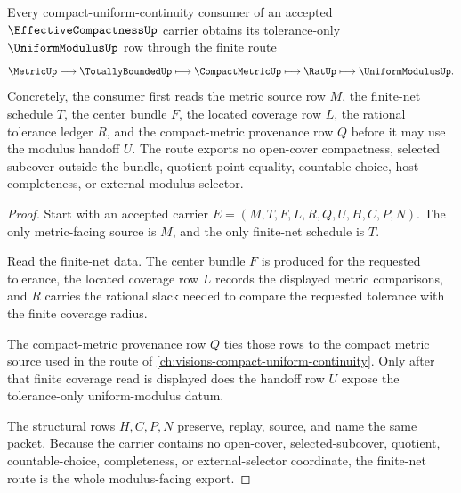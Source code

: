 \begin{theorem}
\label{thm:effective-compactness-finite-net-modulus}
Every compact-uniform-continuity consumer of an accepted $\EffectiveCompactnessUp$ carrier obtains its tolerance-only $\UniformModulusUp$ row through the finite route
$$
\MetricUp \longmapsto \TotallyBoundedUp \longmapsto \CompactMetricUp \longmapsto \RatUp \longmapsto \UniformModulusUp .
$$
Concretely, the consumer first reads the metric source row $M$, the finite-net schedule $T$, the center bundle $F$, the located coverage row $L$, the rational tolerance ledger $R$, and the compact-metric provenance row $Q$ before it may use the modulus handoff $U$. The route exports no open-cover compactness, selected subcover outside the bundle, quotient point equality, countable choice, host completeness, or external modulus selector.
\end{theorem}
\begin{proof}
Start with an accepted carrier $E=(M,T,F,L,R,Q,U,H,C,P,N)$. The only metric-facing source is $M$, and the only finite-net schedule is $T$.

Read the finite-net data. The center bundle $F$ is produced for the requested tolerance, the located coverage row $L$ records the displayed metric comparisons, and $R$ carries the rational slack needed to compare the requested tolerance with the finite coverage radius.

The compact-metric provenance row $Q$ ties those rows to the compact metric source used in the route of \autoref{ch:visions-compact-uniform-continuity}. Only after that finite coverage read is displayed does the handoff row $U$ expose the tolerance-only uniform-modulus datum.

The structural rows $H,C,P,N$ preserve, replay, source, and name the same packet. Because the carrier contains no open-cover, selected-subcover, quotient, countable-choice, completeness, or external-selector coordinate, the finite-net route is the whole modulus-facing export.
\end{proof}


